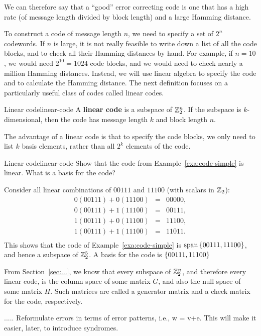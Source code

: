 We can therefore say that a ``good'' error correcting code is one that
has a high rate (of message length divided by block length) and a
large Hamming distance.

To construct a code of message length $n$, we need to specify a set of
$2^n$ codewords. If $n$ is large, it is not really feasible to write
down a list of all the code blocks, and to check all their Hamming
distances by hand. For example, if $n=10$, we would need $2^{10}=1024$
code blocks, and we would need to check nearly a million Hamming
distances. Instead, we will use linear algebra to specify the code and
to calculate the Hamming distance. The next definition focuses on a
particularly useful class of codes called linear codes.

\begin{definition}{Linear code}{linear-code}
  A \textbf{linear code} is a subspace of $\mathbb{Z}_2^n$. If the subspace is
  $k$-dimensional, then the code has message length $k$ and block
  length $n$.
\end{definition}

The advantage of a linear code is that to specify the code blocks, we
only need to list $k$ basis elements, rather than all $2^k$ elements
of the code.

\begin{example}{Linear code}{linear-code}
  Show that the code from Example~\ref{exa:code-simple} is
  linear. What is a basis for the code?
\end{example}

\begin{solution}
  Consider all linear combinations of $00111$ and $11100$ (with
  scalars in $\mathbb{Z}_2$):
  \begin{equation*}
    \begin{array}{rcl}
      0(00111) + 0(11100) &=& 00000, \\
      0(00111) + 1(11100) &=& 00111, \\
      1(00111) + 0(11100) &=& 11100, \\
      1(00111) + 1(11100) &=& 11011. \\
    \end{array}
  \end{equation*}
  This shows that the code of Example~\ref{exa:code-simple} is
  $\sspan\set{00111, 11100}$, and hence a subspace of $\mathbb{Z}_2^5$. A
  basis for the code is $\left\{00111, 11100\right\}$
\end{solution}

From Section~\ref{sec:...}, we know that every subspace of $\mathbb{Z}_2^n$,
and therefore every linear code, is the column space of some matrix
$G$, and also the null space of some matrix $H$. Such matrices are
called a generator matrix and a check matrix for the code,
respectively.


..... Reformulate errors in terms of error patterns, i.e., w = v+e.
This will make it easier, later, to introduce syndromes.



